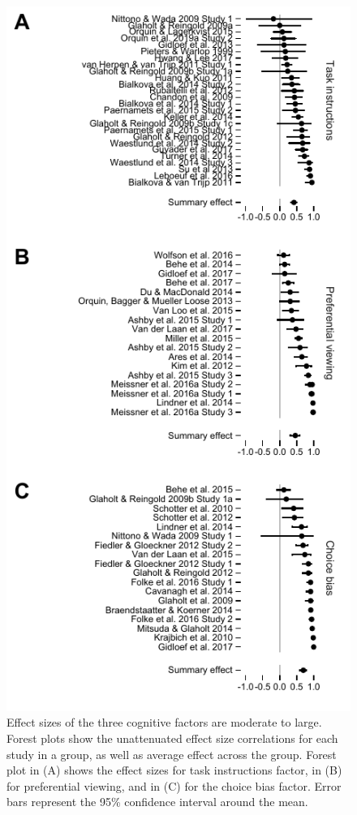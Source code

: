 \documentclass[english,natbib,man,floatsintext]{apa6}
\begin{document}
\begin{figure}[!h]
\includegraphics{forest_plots_cognitive}
\centering
\caption{Effect sizes of the three cognitive factors are moderate to large. Forest plots show the unattenuated effect size correlations for each study in a group, as well as average effect across the group. Forest plot in (A) shows the effect sizes for task instructions factor, in (B) for preferential viewing, and in (C) for the choice bias factor. Error bars represent the 95\% confidence interval around the mean.}
\label{fig:forest_plots_cognitive}
\end{figure}
\end{document}
